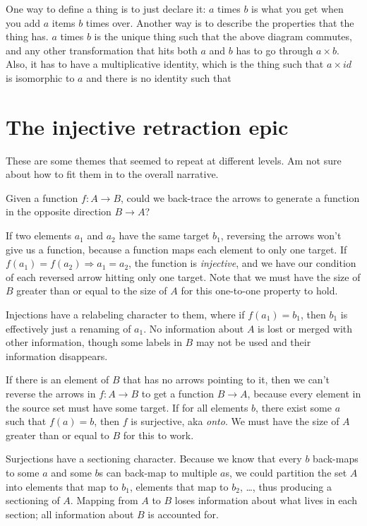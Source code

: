 \documentclass[11pt]{article}
\begin{document}
One way to define a thing is to just declare it: $a$ times $b$ is what you get when you
add $a$ items $b$ times over. Another way is to describe the properties that the thing
has. $a$ times $b$ is the unique thing such that the above diagram commutes, and any other
transformation that hits both $a$ and $b$ has to go through $a\times b$. Also, it has to
have a multiplicative identity, which is the thing such that $a\times id$ is isomorphic
to $a$ and there is no identity such that 

\section{The injective retraction epic}\label{injectivesec}
These are some themes that seemed to repeat at
different levels. Am not sure about how to fit them in to the overall narrative.

Given a function $f:A\to B$, could we back-trace the arrows to generate a function in the opposite direction $B\to A$?

If two elements $a_1$ and $a_2$ have the same target $b_1$, reversing the arrows
won't give us a function, because a function maps each element to only one target.
If $f(a_1)=f(a_2) \Rightarrow a_1=a_2$, the function is {\em injective}, and we have our
condition of each reversed arrow hitting only one target. Note that we must have the size
of $B$ greater than or equal to the size of $A$ for this one-to-one property to hold.

Injections have a relabeling character to them, where if $f(a_1)=b_1$, then $b_1$ is
effectively just a renaming of $a_1$. No information about $A$ is lost or merged with
other information, though some labels in $B$ may not be used and their information
disappears.

If there is an element of $B$ that has no arrows pointing to it, then we can't reverse the
arrows in $f:A\to B$ to get a function $B\to A$, because every element in the source set
must have some target. If for all elements $b$, there exist some $a$ such that $f(a)=b$,
then $f$ is surjective, aka {\em onto}. We must have the size of $A$ greater than or equal
to $B$ for this to work.

Surjections have a sectioning character.  Because we know that every $b$ back-maps to some $a$ and some $b$s
can back-map to multiple $a$s, we could partition the set $A$ into elements that map to $b_1$,
elements that map to $b_2$, \dots, thus producing a sectioning of $A$. Mapping from $A$ to
$B$ loses information about what lives in each section; all information about $B$ is
accounted for.
\end{document}
